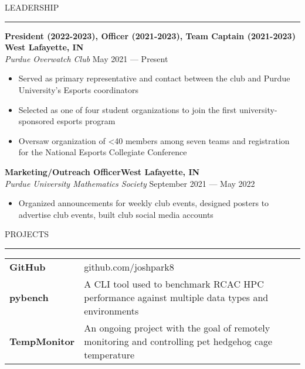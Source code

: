 \documentclass[letter,11pt]{article}
\begin{document}
LEADERSHIP

\vspace*{-1.25em}
\rule{\textwidth}{1.2pt}
\textbf{President (2022-2023), Officer (2021-2023), Team Captain (2021-2023) \hfill West Lafayette, IN}\\
\emph{Purdue Overwatch Club} \hfill May 2021 --- Present\\
\vspace*{-1.75em}
\begin{itemize}[label=-, leftmargin=*, align=left, noitemsep]
    \item Served as primary representative and contact between the club and Purdue University's Esports coordinators
    \item Selected as one of four student organizations to join the first university-sponsored esports program
    \item Oversaw organization of <40 members among seven teams and registration for the National Esports Collegiate Conference
\end{itemize}
\vspace*{-0.25em}

\textbf{Marketing/Outreach Officer\hfill West Lafayette, IN} \\
\emph{Purdue University Mathematics Society} \hfill September 2021 --- May 2022\\
\vspace*{-1.75em}
\begin{itemize}[label=-, leftmargin=*, labelwidth=1.5cm, align=left, noitemsep]
    \item Organized announcements for weekly club events, designed posters to advertise club events, built club social media accounts
\end{itemize}

PROJECTS

\vspace*{-1.25em}
\rule{\textwidth}{1.2pt}

\begin{tabular}{@{}p{2.25cm}l}
    \textbf{GitHub} &github.com/joshpark8 \\
    \textbf{pybench} &A CLI tool used to benchmark RCAC HPC performance against multiple data types and environments \\
    \textbf{TempMonitor} &An ongoing project with the goal of remotely monitoring and controlling pet hedgehog cage temperature
\end{tabular}
\end{document}
